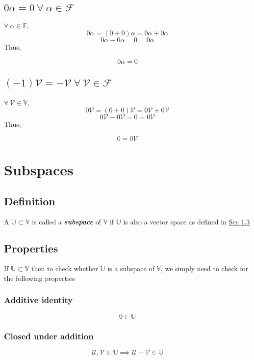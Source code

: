 \subsection{$0\alpha = 0 \  \forall \ \alpha \in \mathcal{F}$}
$\forall \ \alpha \in \mathbb{F}$,
$$0 \alpha = (0 + 0) \alpha = 0 \alpha + 0 \alpha$$
$$0 \alpha - 0 \alpha = 0 = 0 \alpha $$
Thus,
\begin{tcolorbox}
	\begin{equation}
	0\alpha = 0
	\end{equation}
\end{tcolorbox}
\subsection{$(-1)\mathcal{V} = -\mathcal{V} \ \forall \ \mathcal{V} \in \mathcal{F}$}
$\forall \ \mathcal{V} \in \mathbb{V}$,
$$0 \mathcal{V} = (0 + 0) \mathcal{V} = 0 \mathcal{V} + 0 \mathcal{V}$$
$$0 \mathcal{V} - 0 \mathcal{V} = 0 = 0 \mathcal{V} $$
Thus,
\begin{tcolorbox}
	\begin{equation}
	0 = 0 \mathcal{V}
	\end{equation}
\end{tcolorbox}
\section{Subspaces}
\subsection{Definition}
A $\mathbb{U} \subset \mathbb{V}$ is called a \textit{\textbf{subspace}} of $\mathbb{V}$ if $\mathbb{U}$ is also a vector space as defined in \hyperref[sec: Sec 1.3]{Sec 1.3}
\subsection{Properties}
If $\mathbb{U} \subset \mathbb{V}$ then to check whether $\mathbb{U}$ is a subspace of $\mathbb{V}$, we simply need to check for the following properties
\subsubsection{Additive identity}
$$0 \in \mathbb{U}$$
\subsubsection{Closed under addition}
$$\mathcal{U}, \mathcal{V} \in \mathbb{U} \implies \mathcal{U} + \mathcal{V} \in  \mathbb{U}$$
